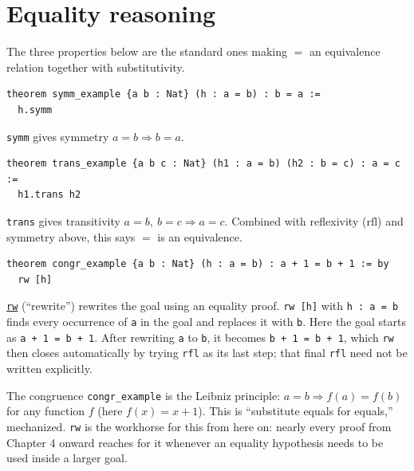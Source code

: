\section{Equality reasoning}\label{sec:03-propositions-and-proofs:07-equality:1}

The three properties below are the standard ones making \(=\) an equivalence relation together with substitutivity.

\begin{lstlisting}
theorem symm_example {a b : Nat} (h : a = b) : b = a :=
  h.symm
\end{lstlisting}

\texttt{symm} gives symmetry \(a = b \Rightarrow b = a\).

\begin{lstlisting}
theorem trans_example {a b c : Nat} (h1 : a = b) (h2 : b = c) : a = c :=
  h1.trans h2
\end{lstlisting}

\texttt{trans} gives transitivity \(a = b,\ b = c \Rightarrow a = c\). Combined with reflexivity (\(\mathrm{rfl}\)) and symmetry above, this says \(=\) is an equivalence.

\begin{lstlisting}
theorem congr_example {a b : Nat} (h : a = b) : a + 1 = b + 1 := by
  rw [h]
\end{lstlisting}

\href{https://lean-lang.org/doc/reference/latest/Tactic-Proofs/Tactic-Reference/}{\texttt{rw}} (``rewrite'') rewrites the goal using an equality proof. \texttt{rw [h]} with \texttt{h : a = b} finds every occurrence of \texttt{a} in the goal and replaces it with \texttt{b}. Here the goal starts as \texttt{a + 1 = b + 1}. After rewriting \texttt{a} to \texttt{b}, it becomes \texttt{b + 1 = b + 1}, which \texttt{rw} then closes automatically by trying \texttt{rfl} as its last step; that final \texttt{rfl} need not be written explicitly.

The congruence \texttt{congr\_example} is the Leibniz principle: \(a = b \Rightarrow
f(a) = f(b)\) for any function \(f\) (here \(f(x) = x + 1\)). This is ``substitute equals for equals,'' mechanized. \texttt{rw} is the workhorse for this from here on: nearly every proof from Chapter 4 onward reaches for it whenever an equality hypothesis needs to be used inside a larger goal.
